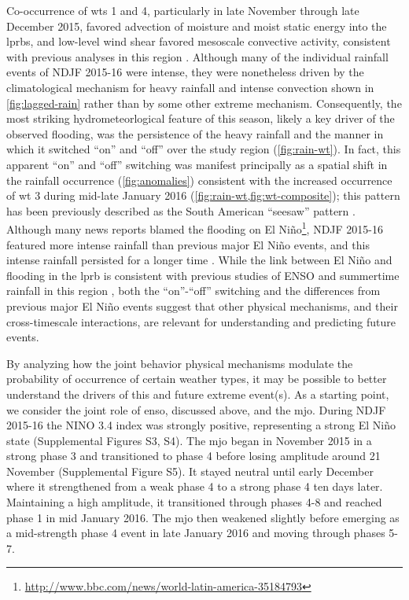 \documentclass[twocol]{ametsoc}
\begin{document}
Co-occurrence of \glspl{wt} 1 and 4, particularly in late November through late December 2015, favored advection of moisture and moist static energy into the \glspl{lprb}, and low-level wind shear favored mesoscale convective activity, consistent with previous analyses in this region \citep{Velasco1987,Marengo2004,Saulo2007,Salio2007}.
Although many of the individual rainfall events of NDJF 2015-16 were intense, they were nonetheless driven by the climatological mechanism for heavy rainfall and intense convection shown in \cref{fig:lagged-rain} rather than by some other extreme mechanism.
Consequently, the most striking hydrometeorlogical feature of this season, likely a key driver of the observed flooding, was the persistence of the heavy rainfall and the manner in which it switched ``on'' and ``off'' over the study region (\cref{fig:rain-wt}).
In fact, this apparent ``on'' and ``off'' switching was manifest principally as a spatial shift in the rainfall occurrence (\cref{fig:anomalies}) consistent with the increased occurrence of \gls{wt} 3 during mid-late January 2016 (\cref{fig:rain-wt,fig:wt-composite}); this pattern has been previously described as the South American ``seesaw'' pattern \citep{Nogues-Paegle1997}.
Although many news reports blamed the flooding on El Ni\~{n}o\footnote{\url{http://www.bbc.com/news/world-latin-america-35184793}}, NDJF 2015-16 featured more intense rainfall than previous major El Ni\~no events, and this intense rainfall persisted for a longer time .
While the link between El Ni\~{n}o and flooding in the \gls{lprb} is consistent with previous studies of ENSO and summertime rainfall in this region \citep{Velasco1987,Grimm2000,Salio2002,Grimm2003,Carvalho2004,Grimm2009a,Bravo2011}, both the ``on''-``off'' switching and the differences from previous major El Ni\~{n}o events suggest that other physical mechanisms, and their cross-timescale interactions, are relevant for understanding and predicting future events.

By analyzing how the joint behavior physical mechanisms modulate the probability of occurrence of certain weather types, it may be possible to better understand the drivers of this and future extreme event(s).
As a starting point, we consider the joint role of \gls{enso}, discussed above, and the \gls{mjo}.
During NDJF 2015-16 the NINO 3.4 index was strongly positive, representing a strong El Ni\~{n}o state (Supplemental Figures S3, S4).
The \gls{mjo} began in November 2015 in a strong phase 3 and transitioned to phase 4 before losing amplitude around 21 November (Supplemental Figure S5).
It stayed neutral until early December where it strengthened from a weak phase 4 to a strong phase 4 ten days later.
Maintaining a high amplitude, it transitioned through phases 4-8 and reached phase 1 in mid January 2016.
The \gls{mjo} then weakened slightly before emerging as a mid-strength phase 4 event in late January 2016 and moving through phases 5-7.
\end{document}
